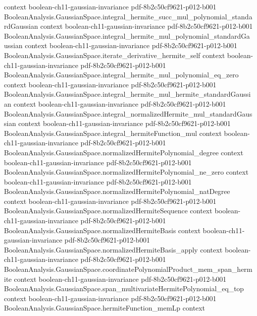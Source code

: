 \begin{lemma}
  {context}
  {boolean-ch11-gaussian-invariance}
  {pdf-8b2c50cf9621-p012-b001}
\proofstep
  {BooleanAnalysis.GaussianSpace.integral_hermite_succ_mul_polynomial_standardGaussian}
  {context}
  {boolean-ch11-gaussian-invariance}
  {pdf-8b2c50cf9621-p012-b001}
\proofstep
  {BooleanAnalysis.GaussianSpace.integral_hermite_mul_polynomial_standardGaussian}
  {context}
  {boolean-ch11-gaussian-invariance}
  {pdf-8b2c50cf9621-p012-b001}
\proofstep
  {BooleanAnalysis.GaussianSpace.iterate_derivative_hermite_self}
  {context}
  {boolean-ch11-gaussian-invariance}
  {pdf-8b2c50cf9621-p012-b001}
\proofstep
  {BooleanAnalysis.GaussianSpace.integral_hermite_mul_polynomial_eq_zero}
  {context}
  {boolean-ch11-gaussian-invariance}
  {pdf-8b2c50cf9621-p012-b001}
\proofstep
  {BooleanAnalysis.GaussianSpace.integral_hermite_mul_hermite_standardGaussian}
  {context}
  {boolean-ch11-gaussian-invariance}
  {pdf-8b2c50cf9621-p012-b001}
\proofstep
  {BooleanAnalysis.GaussianSpace.integral_normalizedHermite_mul_standardGaussian}
  {context}
  {boolean-ch11-gaussian-invariance}
  {pdf-8b2c50cf9621-p012-b001}
\proofstep
  {BooleanAnalysis.GaussianSpace.integral_hermiteFunction_mul}
  {context}
  {boolean-ch11-gaussian-invariance}
  {pdf-8b2c50cf9621-p012-b001}
\proofstep
  {BooleanAnalysis.GaussianSpace.normalizedHermitePolynomial_degree}
  {context}
  {boolean-ch11-gaussian-invariance}
  {pdf-8b2c50cf9621-p012-b001}
\proofstep
  {BooleanAnalysis.GaussianSpace.normalizedHermitePolynomial_ne_zero}
  {context}
  {boolean-ch11-gaussian-invariance}
  {pdf-8b2c50cf9621-p012-b001}
\proofstep
  {BooleanAnalysis.GaussianSpace.normalizedHermitePolynomial_natDegree}
  {context}
  {boolean-ch11-gaussian-invariance}
  {pdf-8b2c50cf9621-p012-b001}
\proofstep
  {BooleanAnalysis.GaussianSpace.normalizedHermiteSequence}
  {context}
  {boolean-ch11-gaussian-invariance}
  {pdf-8b2c50cf9621-p012-b001}
\proofstep
  {BooleanAnalysis.GaussianSpace.normalizedHermiteBasis}
  {context}
  {boolean-ch11-gaussian-invariance}
  {pdf-8b2c50cf9621-p012-b001}
\proofstep
  {BooleanAnalysis.GaussianSpace.normalizedHermiteBasis_apply}
  {context}
  {boolean-ch11-gaussian-invariance}
  {pdf-8b2c50cf9621-p012-b001}
\proofstep
  {BooleanAnalysis.GaussianSpace.coordinatePolynomialProduct_mem_span_hermite}
  {context}
  {boolean-ch11-gaussian-invariance}
  {pdf-8b2c50cf9621-p012-b001}
\proofstep
  {BooleanAnalysis.GaussianSpace.span_multivariateHermitePolynomial_eq_top}
  {context}
  {boolean-ch11-gaussian-invariance}
  {pdf-8b2c50cf9621-p012-b001}
\proofstep
  {BooleanAnalysis.GaussianSpace.hermiteFunction_memLp}
  {context}

\end{lemma}
